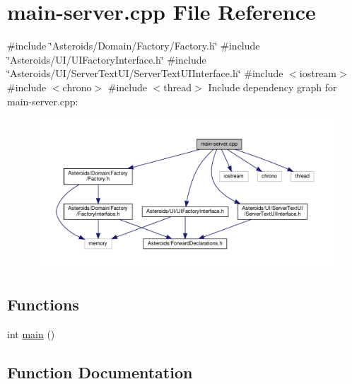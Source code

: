 \hypertarget{main-server_8cpp}{}\section{main-\/server.cpp File Reference}
\label{main-server_8cpp}
{\ttfamily \#include \char`\"{}Asteroids/\+Domain/\+Factory/\+Factory.\+h\char`\"{}}\newline
{\ttfamily \#include \char`\"{}Asteroids/\+U\+I/\+U\+I\+Factory\+Interface.\+h\char`\"{}}\newline
{\ttfamily \#include \char`\"{}Asteroids/\+U\+I/\+Server\+Text\+U\+I/\+Server\+Text\+U\+I\+Interface.\+h\char`\"{}}\newline
{\ttfamily \#include $<$iostream$>$}\newline
{\ttfamily \#include $<$chrono$>$}\newline
{\ttfamily \#include $<$thread$>$}\newline
Include dependency graph for main-\/server.cpp\+:\nopagebreak
\begin{figure}[H]
\begin{center}
\leavevmode
\includegraphics[width=350pt]{main-server_8cpp__incl}
\end{center}
\end{figure}
\subsection*{Functions}
\begin{DoxyCompactItemize}
\item 
int \hyperlink{main-server_8cpp_ae66f6b31b5ad750f1fe042a706a4e3d4}{main} ()
\end{DoxyCompactItemize}


\subsection{Function Documentation}
\mbox{\label{main-server_8cpp_ae66f6b31b5ad750f1fe042a706a4e3d4}} 
